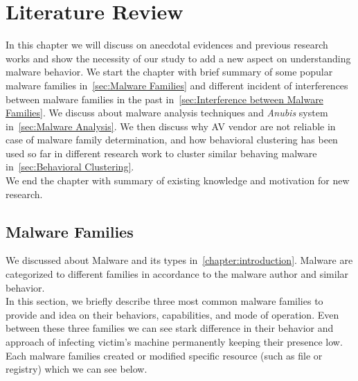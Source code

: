 \chapter{Literature Review}\label{chapter:literature_review}
In this chapter we will discuss on anecdotal evidences and previous research works and show the necessity of our study to add a new aspect on understanding malware behavior.
We start the chapter with brief summary of some popular malware families in~\autoref{sec:Malware Families} and different incident of interferences between malware families in the past in~\autoref{sec:Interference between Malware Families}.
We discuss about malware analysis techniques and \emph{Anubis} system in~\autoref{sec:Malware Analysis}.
We then discuss why AV vendor are not reliable in case of malware family determination, and how behavioral clustering has been used so far in different research work to cluster similar behaving malware in~\autoref{sec:Behavioral Clustering}.\\
We end the chapter with summary of existing knowledge and motivation for new research.
\section{Malware Families}
\label{sec:Malware Families}
We discussed about Malware and its types in~\autoref{chapter:introduction}.
Malware are categorized to different families in accordance to the malware author and similar behavior.\\
In this section, we briefly describe three most common malware families to provide and idea on their behaviors, capabilities, and mode of operation.
Even between these three families we can see stark difference in their behavior and approach of infecting victim's machine permanently keeping their presence low.
Each malware families created or modified specific resource (such as file or registry) which we can see below.
